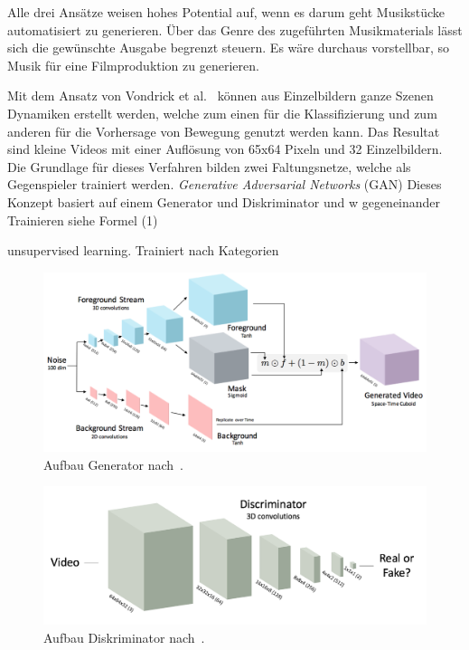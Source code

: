 \documentclass[times, 11pt,twocolumn]{article}
\begin{document}
Alle drei Ansätze weisen hohes Potential auf, wenn es darum geht Musikstücke automatisiert zu generieren. Über das Genre des zugeführten Musikmaterials lässt sich die gewünschte Ausgabe begrenzt steuern. Es wäre durchaus vorstellbar, so Musik für eine Filmproduktion zu generieren.






 \label{sec:Vondrick}
Mit dem Ansatz von Vondrick et al.~\cite{Vondrick} können aus Einzelbildern ganze Szenen Dynamiken erstellt werden, welche zum einen für die Klassifizierung und zum anderen für die Vorhersage von Bewegung genutzt werden kann. Das Resultat sind kleine Videos mit einer Auflösung von 65x64 Pixeln und 32 Einzelbildern. \\

Die Grundlage für dieses Verfahren bilden zwei Faltungsnetze, welche als Gegenspieler trainiert werden. \textit{Generative Adversarial Networks} (GAN) \cite{NIPS2014_5423} Dieses Konzept basiert auf einem Generator und Diskriminator und w
gegeneinander Trainieren siehe Formel (1)

unsupervised learning. 
Trainiert nach Kategorien



\begin{figure}
	\flushleft
	\includegraphics[width=\columnwidth]{Bilder/generator2.jpg}
	\caption{Aufbau Generator nach~\cite{Vondrick}.}
	\label{fig:generator}
\end{figure}


\begin{figure}
	\flushleft
	\includegraphics[width=\columnwidth]{Bilder/discriminator.jpg}
	\caption{Aufbau Diskriminator nach~\cite{Vondrick}.}
	\label{fig:discriminator}
\end{figure}
\end{document}
